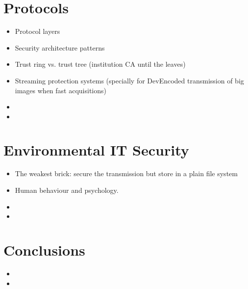\documentclass[10pt,a4paper,twoside]{llncs}
\begin{document}
%
\section{Protocols}

\begin{itemize}
 \item Protocol layers \cite{Schneier:1995:ACP:572932}
 \item Security architecture patterns
 \item Trust ring vs. trust tree (institution CA until the leaves)
 \item Streaming protection systems (specially for DevEncoded transmission of big images when fast acquisitions)
 \item 
 \item 
\end{itemize}

%
\section{Environmental IT Security}

\begin{itemize}
 \item The weakest brick: secure the transmission but store in a plain file system
 \item Human behaviour and psychology.
 \item 
 \item 
\end{itemize}

%
\section{Conclusions \label{sec:conclusions}}

\begin{itemize}
 \item 
 \item 
\end{itemize}



\end{document}
